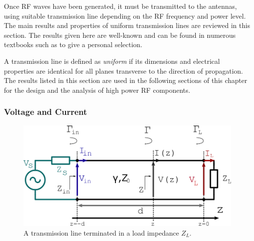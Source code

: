 Once RF waves have been generated, it must be transmitted to the antennas, using suitable transmission line depending on the RF frequency and power level. The main results and properties of uniform transmission lines are reviewed in this section. The results given here are well-known and can be found in numerous textbooks such as  to give a personal selection.

A transmission line is defined as \textit{uniform} if its dimensions and electrical properties are identical for all planes transverse to the direction of propagation. The results listed in this section are used in the following sections of this chapter for the design and the analysis of high power RF components.

\subsubsection{Voltage and Current}

\begin{figure}
	\includegraphics[width=1.0\textwidth]{figures/chap3/transmission_line_properties_vi}
	\caption{A transmission line terminated in a load impedance $Z_L$.}
	\label{fig:transmissionlinepropertiesvi}
\end{figure}

